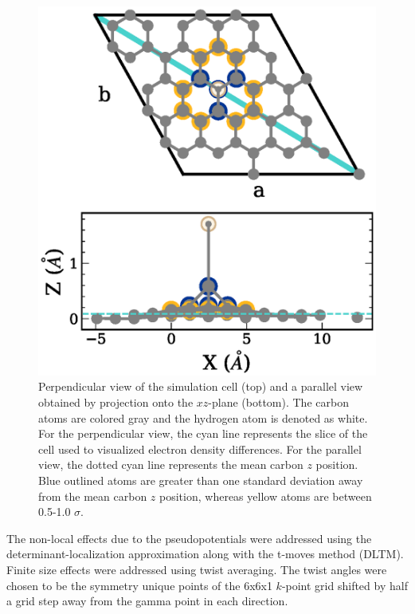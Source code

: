 \begin{figure}
    \centering
    \includegraphics[width=\columnwidth,keepaspectratio]{Images/chapter4/hgraphene_python.eps}
    \caption{ Perpendicular view of the simulation cell (top) and a parallel view obtained by projection onto the $xz$-plane (bottom). The carbon atoms are colored gray and the hydrogen atom is denoted as white. For the perpendicular view, the cyan line represents the slice of the cell used to visualized electron density differences. For the parallel view, the dotted cyan line represents the mean carbon $z$ position. Blue outlined atoms are greater than one standard deviation away from the mean carbon $z$ position, whereas yellow atoms are between 0.5-1.0 $\sigma$.}
    \label{fig:cell}
\end{figure}
The non-local effects due to the pseudopotentials were addressed using the determinant-localization approximation along with the t-moves method (DLTM).\cite{zen_new_2019, 10.1063/1.3380831}
Finite size effects were addressed using twist averaging.\cite{PhysRevE.64.016702} The twist angles were chosen to be the symmetry unique points of the 6x6x1 $k$-point grid shifted by half a grid step away from the gamma point in each direction.

